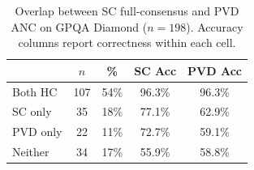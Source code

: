 \begin{table}[h]
\centering
\caption{Overlap between SC full-consensus and PVD ANC on GPQA Diamond ($n{=}198$). Accuracy columns report correctness within each cell.}
\label{tab:sc-pvd}
\small
\begin{tabular}{lcccc}
\toprule
 & \textbf{$n$} & \textbf{\%} & \textbf{SC Acc} & \textbf{PVD Acc} \\
\midrule
Both HC & 107 & 54\% & 96.3\% & 96.3\% \\
SC only & 35 & 18\% & 77.1\% & 62.9\% \\
PVD only & 22 & 11\% & 72.7\% & 59.1\% \\
Neither & 34 & 17\% & 55.9\% & 58.8\% \\
\bottomrule
\end{tabular}
\end{table}
